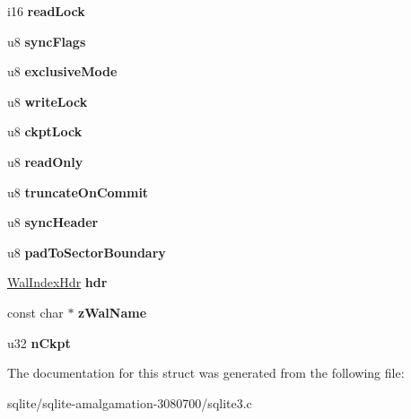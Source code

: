 \begin{DoxyCompactItemize}
\item 
\hypertarget{struct_wal_a260550c859ac7224fbdad0586dca664a}{i16 {\bfseries read\+Lock}}\label{struct_wal_a260550c859ac7224fbdad0586dca664a}

\item 
\hypertarget{struct_wal_ac1382875f5fe049ccf09f1c2d370c429}{u8 {\bfseries sync\+Flags}}\label{struct_wal_ac1382875f5fe049ccf09f1c2d370c429}

\item 
\hypertarget{struct_wal_ada255c96ca65d9d8955bbf139af4e6f4}{u8 {\bfseries exclusive\+Mode}}\label{struct_wal_ada255c96ca65d9d8955bbf139af4e6f4}

\item 
\hypertarget{struct_wal_ad7f4ba84f07115b7ce3a6133479c9d24}{u8 {\bfseries write\+Lock}}\label{struct_wal_ad7f4ba84f07115b7ce3a6133479c9d24}

\item 
\hypertarget{struct_wal_a29153bfb37a9a32f1171e5c1d10994d2}{u8 {\bfseries ckpt\+Lock}}\label{struct_wal_a29153bfb37a9a32f1171e5c1d10994d2}

\item 
\hypertarget{struct_wal_a38f0810e34bdc89acdf27574473c0495}{u8 {\bfseries read\+Only}}\label{struct_wal_a38f0810e34bdc89acdf27574473c0495}

\item 
\hypertarget{struct_wal_a12870bbe7755271c94c3eb1fd0280c56}{u8 {\bfseries truncate\+On\+Commit}}\label{struct_wal_a12870bbe7755271c94c3eb1fd0280c56}

\item 
\hypertarget{struct_wal_ae3de9666170c103a835a2c767932d3f9}{u8 {\bfseries sync\+Header}}\label{struct_wal_ae3de9666170c103a835a2c767932d3f9}

\item 
\hypertarget{struct_wal_af10e79ca8fe617d7df706182ebdf7039}{u8 {\bfseries pad\+To\+Sector\+Boundary}}\label{struct_wal_af10e79ca8fe617d7df706182ebdf7039}

\item 
\hypertarget{struct_wal_adbeef9e632541fbf07c926652b165906}{\hyperlink{struct_wal_index_hdr}{Wal\+Index\+Hdr} {\bfseries hdr}}\label{struct_wal_adbeef9e632541fbf07c926652b165906}

\item 
\hypertarget{struct_wal_ac54961758701702d67eaf3ce15c69ea5}{const char $\ast$ {\bfseries z\+Wal\+Name}}\label{struct_wal_ac54961758701702d67eaf3ce15c69ea5}

\item 
\hypertarget{struct_wal_a8fbe9b014342db76d8167b518b70acad}{u32 {\bfseries n\+Ckpt}}\label{struct_wal_a8fbe9b014342db76d8167b518b70acad}

\end{DoxyCompactItemize}


The documentation for this struct was generated from the following file\+:\begin{DoxyCompactItemize}
\item 
sqlite/sqlite-\/amalgamation-\/3080700/sqlite3.\+c\end{DoxyCompactItemize}
